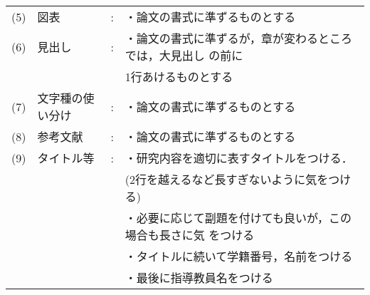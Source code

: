 \begin{tabular}{llcl}
  (5) & 図表                              & : & ・論文の書式に準ずるものとする                           \\
  (6) & 見出し                            & : & ・論文の書式に準ずるが，章が変わるところでは，大見出し
  の前に                                                                                                 \\
      &                                   &   & \hspace*{1zw}1行あけるものとする                         \\
  (7) & 文字種の使い分け                  & : & ・論文の書式に準ずるものとする                           \\
  (8) & 参考文献                          & : & ・論文の書式に準ずるものとする                           \\
  (9) & タイトル等                        & : & ・研究内容を適切に表すタイトルをつける．                 \\
      &                                   &   & \hspace*{1zw}(2行を越えるなど長すぎないように気をつける) \\
      &                                   &   & ・必要に応じて副題を付けても良いが，この場合も長さに気
  をつける                                                                                               \\
      &                                   &   & ・タイトルに続いて学籍番号，名前をつける                 \\
      &                                   &   & ・最後に指導教員名をつける                               \\
\end{tabular}

\clearpage

